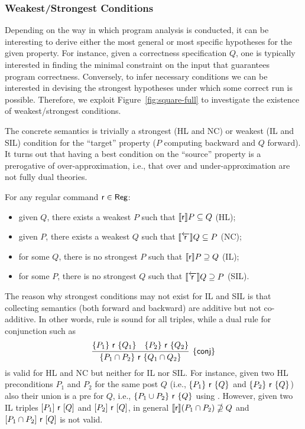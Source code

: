 \subsubsection*{Weakest/Strongest Conditions}
Depending on the way in which program analysis is conducted, it can be interesting to derive either the most general or most specific hypotheses for the given property.
For instance, given a correctness specification $Q$, one is typically interested in finding the minimal constraint on the input that guarantees program correctness.
Conversely, to infer necessary conditions we can be interested in devising the strongest hypotheses under which some correct run is possible.
%
Therefore, we exploit Figure~\ref{fig:square-full} to investigate the existence of weakest/strongest conditions.

The concrete semantics is trivially a strongest (HL and NC) or weakest (IL and SIL) condition for the ``target'' property ($P$ computing backward and $Q$ forward).
It turns out that having a best condition on the ``source'' property is a prerogative of over-approximation, i.e., that over and under-approximation are not fully dual theories.
\begin{prop}\label{prop:weakest-pre-existence1}\label{prop:weakest-pre-existence2}
	For any regular command $\mathsf{r}\in\mathsf{Reg}$:
	\begin{itemize}
		\item given $Q$, there exists a weakest $P$ such that $\llbracket\mathsf{r}\rrbracket P \subseteq Q$ (HL);
		\item given $P$, there exists a weakest $Q$ such that $\llbracket\overleftarrow{\mathsf{r}}\rrbracket Q \subseteq P$ (NC);
		\item for some $Q$, there is no strongest $P$ such that $\llbracket\mathsf{r}\rrbracket P \supseteq Q$ (IL);
		\item for some $P$, there is no strongest $Q$ such that $\llbracket\overleftarrow{\mathsf{r}}\rrbracket Q \supseteq P$ (SIL).
	\end{itemize}
\end{prop}

The reason why strongest conditions may not exist for IL and SIL is that collecting semantics (both forward and backward) are additive but not co-additive. In other words, rule  is sound for all triples, while a dual rule for conjunction such as
\[
\infer[\{\mathsf{conj}\}]
{\overtriple{P_1 \cap P_2}{\regr}{Q_1 \cap Q_2}}
{\overtriple{P_1}{\regr}{Q_1} & \overtriple{P_2}{\regr}{Q_2} }
\]
is valid for HL and NC but neither for IL nor SIL.
For instance, given two HL preconditions $P_1$ and $P_2$ for the same post $Q$ (i.e., $\{P_1\}~\mathsf{r}~\{Q\}$ and $\{P_2\}~\mathsf{r}~\{Q\}$) also their union is a pre for $Q$, i.e., $\{P_1 \cup P_2\}~\mathsf{r}~\{Q\}$ using . However, given two IL triples $[P_1]~\mathsf{r}~[Q]$ and $[P_2]~\mathsf{r}~[Q]$, in general $\llbracket\mathsf{r}\rrbracket (P_1 \cap P_2) \nsupseteq Q$ and $[P_1 \cap P_2]~\mathsf{r}~[Q]$ is not valid.

